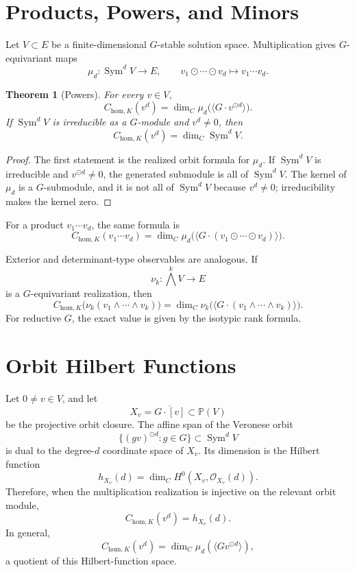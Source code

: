 \documentclass[11pt]{article}
\newtheorem{theorem}{Theorem}[section]
\DeclareMathOperator{\Sym}{Sym}
\begin{document}
\section{Products, Powers, and Minors}

Let \(V\subset E\) be a finite-dimensional \(G\)-stable solution space. Multiplication gives \(G\)-equivariant maps
\[
\mu_d:\Sym^d V\to E,\qquad
v_1\odot\cdots\odot v_d\mapsto v_1\cdots v_d.
\]

\begin{theorem}[Powers]
For every \(v\in V\),
\[
C_{\mathrm{hom},K}(v^d)
=
\dim_C
\mu_d\bigl(\langle G\cdot v^{\odot d}\rangle\bigr).
\]
If \(\Sym^d V\) is irreducible as a \(G\)-module and \(v^d\ne0\), then
\[
C_{\mathrm{hom},K}(v^d)=\dim_C\Sym^d V.
\]
\end{theorem}

\begin{proof}
The first statement is the realized orbit formula for \(\mu_d\). If \(\Sym^d V\) is irreducible and \(v^{\odot d}\ne0\), the generated submodule is all of \(\Sym^d V\). The kernel of \(\mu_d\) is a \(G\)-submodule, and it is not all of \(\Sym^d V\) because \(v^d\ne0\); irreducibility makes the kernel zero.
\end{proof}

For a product \(v_1\cdots v_d\), the same formula is
\[
C_{\mathrm{hom},K}(v_1\cdots v_d)
=
\dim_C
\mu_d\bigl(\langle G\cdot(v_1\odot\cdots\odot v_d)\rangle\bigr).
\]

Exterior and determinant-type observables are analogous. If
\[
\nu_k:\bigwedge^k V\to E
\]
is a \(G\)-equivariant realization, then
\[
C_{\mathrm{hom},K}\bigl(\nu_k(v_1\wedge\cdots\wedge v_k)\bigr)
=
\dim_C
\nu_k\bigl(\langle G\cdot(v_1\wedge\cdots\wedge v_k)\rangle\bigr).
\]
For reductive \(G\), the exact value is given by the isotypic rank formula.

\section{Orbit Hilbert Functions}

Let \(0\ne v\in V\), and let
\[
X_v=\overline{G\cdot[v]}\subset \mathbb P(V)
\]
be the projective orbit closure. The affine span of the Veronese orbit
\[
\{(gv)^{\odot d}:g\in G\}\subset \Sym^d V
\]
is dual to the degree-\(d\) coordinate space of \(X_v\). Its dimension is the Hilbert function
\[
h_{X_v}(d)=\dim_C H^0(X_v,\mathcal O_{X_v}(d)).
\]
Therefore, when the multiplication realization is injective on the relevant orbit module,
\[
C_{\mathrm{hom},K}(v^d)=h_{X_v}(d).
\]
In general,
\[
C_{\mathrm{hom},K}(v^d)
=
\dim_C\mu_d(\langle Gv^{\odot d}\rangle),
\]
a quotient of this Hilbert-function space.
\end{document}
